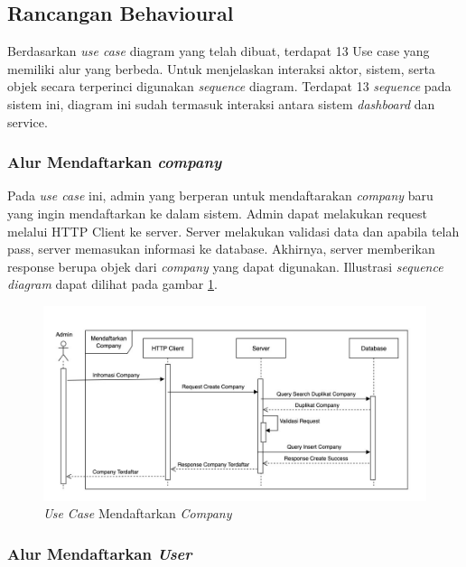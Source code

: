 \subsection{Rancangan Behavioural}
\label{subsec:arsitektur-behavioural}

Berdasarkan \textit{use case} diagram yang telah dibuat, terdapat 13 Use case yang memiliki alur yang berbeda. Untuk menjelaskan interaksi aktor, sistem, serta objek secara terperinci digunakan \textit{sequence} diagram. Terdapat 13 \textit{sequence} pada sistem ini, diagram ini sudah termasuk interaksi antara sistem \textit{dashboard} dan service.

\subsubsection{Alur Mendaftarkan \textit{company}}

Pada \textit{use case} ini, admin yang berperan untuk mendaftarakan \textit{company} baru yang ingin mendaftarkan ke dalam sistem. Admin dapat melakukan request melalui HTTP Client ke server. Server melakukan validasi data dan apabila telah pass, server memasukan informasi ke database. Akhirnya, server memberikan response berupa objek dari \textit{company} yang dapat digunakan. Illustrasi \textit{sequence diagram} dapat dilihat pada gambar \ref{fig:usecase-01}.

\begin{figure}
  \centering
  \includegraphics[width=1\textwidth]{resources/chapter-3/usecase/uc-01.jpg}
  \caption{\textit{Use Case} Mendaftarkan \textit{Company}}
  \label{fig:usecase-01}
\end{figure}

\pagebreak

\subsubsection{Alur Mendaftarkan \textit{User}}

